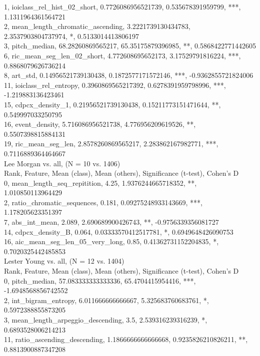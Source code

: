 1, ioiclass_rel_hist_02_short, 0.7726086956521739, 0.535678391959799, ***, 1.1311964361564721\\
2, mean_length_chromatic_ascending, 3.2221739130434783, 2.3537903804737974, *, 0.5133014413806197\\
3, pitch_median, 68.28260869565217, 65.35175879396985, **, 0.5868422771442605\\
6, ric_mean_seg_len_02_short, 4.772608695652173, 3.17529791816224, ***, 0.8868079626736214\\
8, art_std, 0.14956521739130438, 0.1872577171572146, ***, -0.9362855721824006\\
11, ioiclass_rel_entropy, 0.3960869565217392, 0.6278391959798996, ***, -1.219883136423461\\
15, cdpcx_density_1, 0.21956521739130438, 0.15211773151471644, **, 0.549997033250795\\
16, event_density, 5.716086956521738, 4.776956209619526, **, 0.5507398815884131\\
19, ric_mean_seg_len, 2.8578260869565217, 2.283862167982771, ***, 0.7116889364464667\\
Lee Morgan vs. all, (N = 10 vs. 1406)\\
Rank, Feature, Mean (class), Mean (others), Significance (t-test), Cohen's D\\
0, mean_length_seq_repitition, 4.25, 1.9376244665718352, **, 1.010850113964429\\
2, ratio_chromatic_sequences, 0.181, 0.09275248933143669, ***, 1.178205623351397\\
7, abs_int_mean, 2.089, 2.690689900426743, **, -0.9756339356081727\\
14, cdpcx_density_B, 0.064, 0.03333570412517781, *, 0.6949648426090753\\
16, aic_mean_seg_len_05_very_long, 0.85, 0.41362731152204835, *, 0.7020325442485853\\
Lester Young vs. all, (N = 12 vs. 1404)\\
Rank, Feature, Mean (class), Mean (others), Significance (t-test), Cohen's D\\
0, pitch_median, 57.083333333333336, 65.4704415954416, ***, -1.6948568856742552\\
2, int_bigram_entropy, 6.011666666666667, 5.325683760683761, *, 0.5972388855873205\\
3, mean_length_arpeggio_descending, 3.5, 2.539316239316239, *, 0.6893528006214213\\
11, ratio_ascending_descending, 1.1866666666666668, 0.9235826210826211, **, 0.8813900887347208\\
